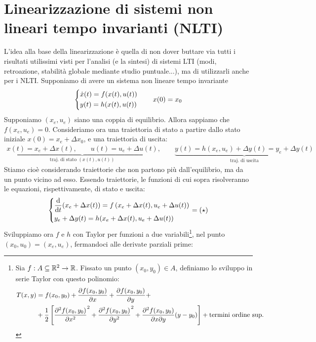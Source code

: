 \documentclass[a4paper]{report}
\begin{document}
\section{Linearizzazione di sistemi non lineari tempo invarianti (NLTI)}
L'idea alla base della linearizzazione è quella di non dover buttare via tutti i risultati utilissimi visti per l'analisi (e la sintesi) di sistemi LTI (modi, retroazione, stabilità globale mediante studio puntuale...), ma di utilizzarli anche per i NLTI.
\bb
	Supponiamo di avere un sistema non lineare tempo invariante$$\begin{dcases}
	\dot x(t) = f(x(t),u(t)) \\
	y(t) = h(x(t), u(t))
\end{dcases}
 \quad \quad x(0) = x_0$$
	Supponiamo $(x_e,u_e)$ siano una coppia di equilibrio. Allora sappiamo che $f(x_e, u_e) = 0$. Consideriamo ora una traiettoria di stato a partire dallo stato iniziale $x(0) = x_e + \Delta x_0$, e una traiettoria di uscita:
\begin{align*}
\underbrace{x(t) = x_e+\Delta x(t), \quad \quad u(t) = u_e+ \Delta u(t)}_{\textrm{traj. di stato } (x(t), u(t))}, \quad  \quad \underbrace{y(t) = h(x_e, u_e) + \Delta y(t) = y_e + \Delta y(t)}_{\textrm{traj. di uscita}}
\end{align*}
Stiamo cioè considerando traiettorie che non partono più dall'equilibrio, ma da un punto vicino ad esso. Essendo traiettorie, le funzioni di cui sopra risolveranno le equazioni, rispettivamente, di stato e uscita:
\begin{align*}
\begin{dcases}
	\dv{t}(x_e + \Delta x(t)) = f\left( x_e+\Delta x(t), u_e + \Delta u(t) \right) \\
	y_e + \Delta y(t) = h(x_e+\Delta x(t), u_e + \Delta u(t))
\end{dcases} = (\star)
\end{align*}
Sviluppiamo ora $f$ e $h$ con Taylor per funzioni a due variabili\footnote{Sia $f: A \subseteq \mathbb{R}^2 \rightarrow \mathbb{R}$. Fissato un punto $(x_0, y_0) \in A$, definiamo lo sviluppo in serie Taylor con questo polinomio:
\begin{align*}
	T(x,y) & = f(x_0, y_0) + \pdv{f(x_0, y_0)}{x} (x - x_0)+\pdv{f(x_0, y_0)}{y} (y - y_0) +\\ & + \frac{1}{2} \left[ \pdv[2]{f(x_0, y_0)}{x} (x - x_0)^2 + \pdv[2]{f(x_0, y_0)}{y} (y - y_0)^2 + \pdv{f(x_0, y_0)}{x}{y} (x - x_0)(y-y_0) \right] + \textrm{termini ordine sup.}
\end{align*}
}, nel punto $(x_0, u_0) = (x_e, u_e)$, fermandoci alle derivate parziali prime:
\end{document}
